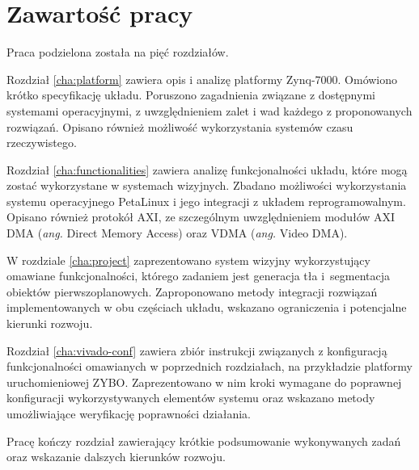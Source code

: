 \section{Zawartość pracy}

Praca podzielona została na pięć rozdziałów.

Rozdział \ref{cha:platform} zawiera opis i analizę platformy Zynq-7000. Omówiono krótko specyfikację układu. Poruszono zagadnienia związane z dostępnymi systemami operacyjnymi, z uwzględnieniem zalet i wad każdego z proponowanych rozwiązań. Opisano również możliwość wykorzystania systemów czasu rzeczywistego.

Rozdział \ref{cha:functionalities} zawiera analizę funkcjonalności układu, które mogą zostać wykorzystane w systemach wizyjnych. Zbadano możliwości wykorzystania systemu operacyjnego PetaLinux i jego integracji z układem reprogramowalnym. Opisano również protokół AXI, ze szczególnym uwzględnieniem modułów AXI DMA (\emph{ang.} Direct Memory Access) oraz VDMA (\emph{ang.} Video DMA).

W rozdziale \ref{cha:project} zaprezentowano system wizyjny wykorzystujący omawiane funkcjonalności, którego zadaniem jest generacja tła i~segmentacja obiektów pierwszoplanowych. Zaproponowano metody integracji rozwiązań implementowanych w obu częściach układu, wskazano ograniczenia i potencjalne kierunki rozwoju.

Rozdział \ref{cha:vivado-conf} zawiera zbiór instrukcji związanych z konfiguracją funkcjonalności omawianych w poprzednich rozdziałach, na przykładzie platformy uruchomieniowej ZYBO. Zaprezentowano w nim kroki wymagane do poprawnej konfiguracji wykorzystywanych elementów systemu oraz wskazano metody umożliwiające weryfikację poprawności działania.

Pracę kończy rozdział zawierający krótkie podsumowanie wykonywanych zadań oraz wskazanie dalszych kierunków rozwoju.
